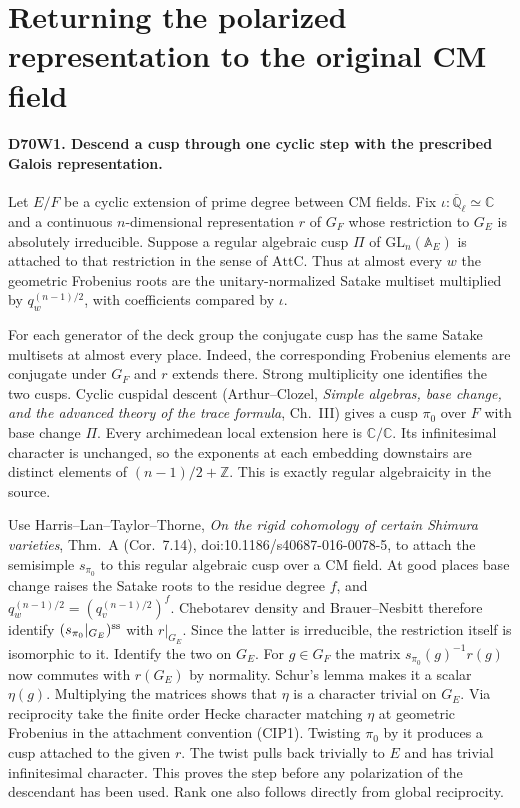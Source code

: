 \section{Returning the polarized representation to the original CM field}

\paragraph{D70W1. Descend a cusp through one cyclic step with the prescribed Galois representation.}
Let $E/F$ be a cyclic extension of prime degree between CM fields. Fix
$\iota:\overline{\mathbb Q}_\ell\simeq\mathbb C$ and a continuous
$n$-dimensional representation $r$ of $G_F$ whose restriction to
$G_E$ is absolutely irreducible. Suppose a regular algebraic cusp
$\Pi$ of $\mathrm{GL}_n(\mathbb A_E)$ is attached to that restriction
in the sense of $\mathrm{AttC}$. Thus at almost every $w$ the
geometric Frobenius roots are the unitary-normalized Satake multiset
multiplied by $q_w^{(n-1)/2}$, with coefficients compared by $\iota$.

For each generator of the deck group the conjugate cusp has the
same Satake multisets at almost every place. Indeed, the corresponding
Frobenius elements are conjugate under $G_F$ and $r$ extends there.
Strong multiplicity one identifies the two cusps. Cyclic cuspidal
descent (Arthur--Clozel, \emph{Simple algebras, base change, and
the advanced theory of the trace formula}, Ch.~III) gives a cusp
$\pi_0$ over $F$ with base change $\Pi$. Every archimedean local
extension here is $\mathbb C/\mathbb C$. Its infinitesimal character
is unchanged, so the exponents at each embedding downstairs are
distinct elements of $(n-1)/2+\mathbb Z$. This is exactly regular
algebraicity in the source.

Use Harris--Lan--Taylor--Thorne, \emph{On the rigid cohomology of
certain Shimura varieties}, Thm.~A (Cor.~7.14),
doi:10.1186/s40687-016-0078-5, to attach the semisimple
$s_{\pi_0}$ to this regular algebraic cusp over a CM field. At good
places base change raises the Satake roots to the residue degree
$f$, and $q_w^{(n-1)/2}=(q_v^{(n-1)/2})^f$. Chebotarev density and
Brauer--Nesbitt therefore identify $(s_{\pi_0}|_{G_E})^{\rm ss}$
with $r|_{G_E}$. Since the latter is irreducible, the restriction
itself is isomorphic to it. Identify the two on $G_E$. For $g\in G_F$
the matrix $s_{\pi_0}(g)^{-1}r(g)$ now commutes with $r(G_E)$ by
normality. Schur's lemma makes it a scalar $\eta(g)$. Multiplying
the matrices shows that $\eta$ is a character trivial on $G_E$.
Via reciprocity take the finite order Hecke character matching
$\eta$ at geometric Frobenius in the attachment convention (CIP1).
Twisting $\pi_0$ by it produces a cusp attached to the given $r$.
The twist pulls back trivially to $E$ and has trivial infinitesimal
character. This proves the step before any polarization of the
descendant has been used. Rank one also follows directly from
global reciprocity.

